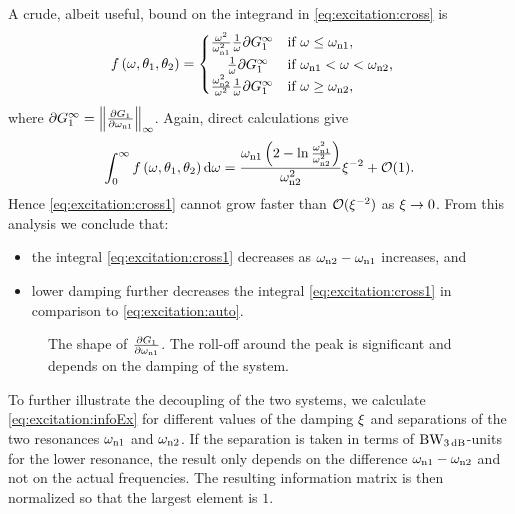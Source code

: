A crude, albeit useful, bound on the integrand in \eqref{eq:excitation:cross} is
\begin{align}
&f\left(\omega,\theta_1,\theta_2\right)=
  \begin{cases}
   \frac{\omega^2}{\wn[1]^2}
   \frac{1}{\omega}
   \partial G_1^\infty
                                       & \text{if $\omega \leq \wn[1]$,}\\
   \phantom{\frac{\omega^2}{\omega^2}}
   \frac{1}{\omega}
   \partial G_1^\infty
                                       & \text{if $\wn[1] < \omega < \wn[2]$,}\\
   \frac{\wn[2]^2}{\omega^2}
   \frac{1}{\omega}
   \partial G_1^\infty
                                       & \text{if $\omega \geq \wn[2]$,}
  \end{cases}
\end{align}
where $\partial G_1^\infty = \left\|\frac{\partial G_1}{\partial \wn[1]}\right\|_\infty$. 
Again, direct calculations give
\begin{align}
\int_0^\infty f\left(\omega,\theta_1,\theta_2\right)\dd\omega = \frac{\wn[1]\left(2-\ln{\frac{\wn[1]^2}{\wn[2]^2}}\right)}{\wn[2]^2}\damping^{-2} + \mathcal{O}(1).
\end{align}
Hence \eqref{eq:excitation:cross1} cannot grow faster than $\mathcal{O}(\damping^{-2})$ as $\damping\rightarrow0$. From this analysis we conclude that:
\begin{itemize}
\item the integral \eqref{eq:excitation:cross1} decreases as $\wn[2]-\wn[1]$ increases, and
\item lower damping further decreases the integral \eqref{eq:excitation:cross1} in comparison to \eqref{eq:excitation:auto}.
\end{itemize}

\begin{figure}
\centering

\caption{The shape of $\frac{\partial G_1}{\partial \wn[1]}$. The roll-off around the peak is significant and depends on the damping of the system.}
\label{fig:excitation:dG}
\end{figure}

To further illustrate the decoupling of the two systems, we calculate \eqref{eq:excitation:infoEx} for different values of the damping $\damping$ and separations of the two resonances $\wn[1]$ and $\wn[2]$. If the separation is taken in terms of $\wdB$-units for the lower resonance, the result only depends on the difference $\wn[1]-\wn[2]$ and not on the actual frequencies. The resulting information matrix is then normalized so that the largest element is $1$.

